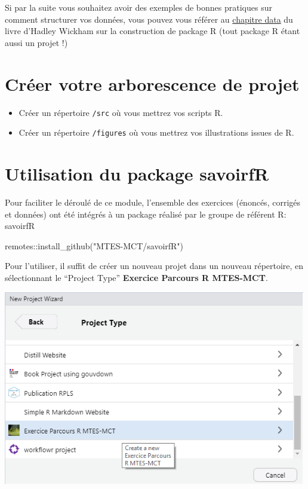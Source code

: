 \documentclass[
]{book}
\newenvironment{Shaded}{\begin{snugshade}}{\end{snugshade}}
\newcommand{\FunctionTok}[1]{\textcolor[rgb]{0.00,0.00,0.00}{#1}}
\newcommand{\NormalTok}[1]{#1}
\newcommand{\SpecialCharTok}[1]{\textcolor[rgb]{0.00,0.00,0.00}{#1}}
\newcommand{\StringTok}[1]{\textcolor[rgb]{0.31,0.60,0.02}{#1}}
\begin{document}
Si par la suite vous souhaitez avoir des exemples de bonnes pratiques sur comment structurer vos données, vous pouvez vous référer au \href{http://r-pkgs.had.co.nz/data.html}{chapitre data} du livre d'Hadley Wickham sur la construction de package R (tout package R étant aussi un projet !)

\hypertarget{cruxe9er-votre-arborescence-de-projet}{%
\section{Créer votre arborescence de projet}\label{cruxe9er-votre-arborescence-de-projet}}

\begin{itemize}
\item
  Créer un répertoire \texttt{/src} où vous mettrez vos scripts R.
\item
  Créer un répertoire \texttt{/figures} où vous mettrez vos illustrations issues de R.
\end{itemize}

\hypertarget{utilisation-du-package-savoirfr}{%
\section{Utilisation du package savoirfR}\label{utilisation-du-package-savoirfr}}

Pour faciliter le déroulé de ce module, l'ensemble des exercices (énoncés, corrigés et données) ont été intégrés à un package réalisé par le groupe de référent R: savoirfR

\begin{Shaded}
\begin{Highlighting}[]
\NormalTok{remotes}\SpecialCharTok{::}\FunctionTok{install\_github}\NormalTok{(}\StringTok{"MTES{-}MCT/savoirfR"}\NormalTok{)}
\end{Highlighting}
\end{Shaded}

Pour l'utiliser, il suffit de créer un nouveau projet dans un nouveau répertoire, en sélectionnant le ``Project Type'' \textbf{Exercice Parcours R MTES-MCT}.

\includegraphics[width=5.20833in,height=\textheight]{pic/projetsavoirfR1.PNG}
\end{document}
